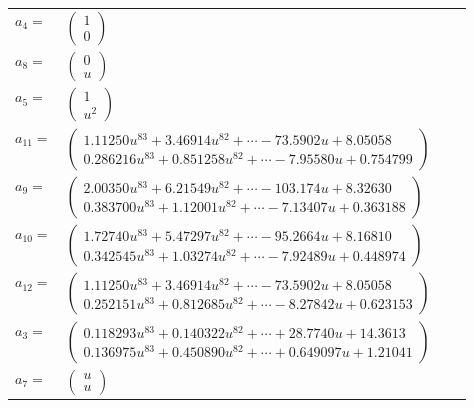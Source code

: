 \documentclass[1p]{elsarticle_modified}
\theoremstyle{definition}
\begin{document}
\begin{tabular}{m{7pt} m{180pt} m{7pt} m{180pt} }
\flushright $a_{4}=$&$\begin{pmatrix}1\\0\end{pmatrix}$ \\
\flushright $a_{8}=$&$\begin{pmatrix}0\\u\end{pmatrix}$ \\
\flushright $a_{5}=$&$\begin{pmatrix}1\\u^2\end{pmatrix}$ \\
\flushright $a_{11}=$&$\begin{pmatrix}1.11250 u^{83}+3.46914 u^{82}+\cdots-73.5902 u+8.05058\\0.286216 u^{83}+0.851258 u^{82}+\cdots-7.95580 u+0.754799\end{pmatrix}$ \\
\flushright $a_{9}=$&$\begin{pmatrix}2.00350 u^{83}+6.21549 u^{82}+\cdots-103.174 u+8.32630\\0.383700 u^{83}+1.12001 u^{82}+\cdots-7.13407 u+0.363188\end{pmatrix}$ \\
\flushright $a_{10}=$&$\begin{pmatrix}1.72740 u^{83}+5.47297 u^{82}+\cdots-95.2664 u+8.16810\\0.342545 u^{83}+1.03274 u^{82}+\cdots-7.92489 u+0.448974\end{pmatrix}$ \\
\flushright $a_{12}=$&$\begin{pmatrix}1.11250 u^{83}+3.46914 u^{82}+\cdots-73.5902 u+8.05058\\0.252151 u^{83}+0.812685 u^{82}+\cdots-8.27842 u+0.623153\end{pmatrix}$ \\
\flushright $a_{3}=$&$\begin{pmatrix}0.118293 u^{83}+0.140322 u^{82}+\cdots+28.7740 u+14.3613\\0.136975 u^{83}+0.450890 u^{82}+\cdots+0.649097 u+1.21041\end{pmatrix}$ \\
\flushright $a_{7}=$&$\begin{pmatrix}u\\u\end{pmatrix}$ \\

\end{tabular}
\end{document}
